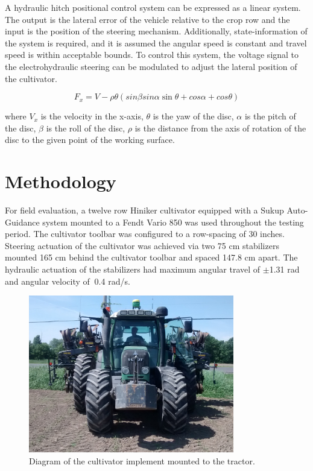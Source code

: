 \documentclass[authoryear]{elsarticle}
\begin{document}
A hydraulic hitch positional control system can be expressed as a
linear system. The output is the lateral error of the vehicle relative
to the crop row and the input is the position of the steering
mechanism. Additionally, state-information of the system is required,
and it is assumed the angular speed is constant and travel speed is
within acceptable bounds. To control this system, the voltage signal
to the electrohydraulic steering can be modulated to adjust the
lateral position of the cultivator.

\begin{equation}
  F_x = V - \rho\theta(sin \beta sin \alpha \sin \theta + cos \alpha +
  cos \theta)
  \label{eq:horizontal_velocity}
\end{equation}
\begin{flushleft}
where $V_x$ is the velocity in the x-axis, $\theta$ is the yaw of the
disc, $\alpha$ is the pitch of the
disc, $\beta$ is the roll of the disc, $\rho$ is the distance from
the axis of rotation of the disc to the given point of the working surface.
\end{flushleft}

\section{Methodology}
For field evaluation, a twelve row Hiniker cultivator equipped with a
Sukup Auto-Guidance system mounted to a Fendt Vario 850 was used
throughout the testing period. The cultivator toolbar was configured
to a row-spacing of 30 inches. Steering actuation of the cultivator
was achieved via two 75 cm stabilizers mounted 165 cm behind the
cultivator toolbar and spaced 147.8 cm apart. The hydraulic actuation
of the stabilizers had maximum angular travel of $\pm$1.31 rad and angular
velocity of $~$0.4 rad/s.

\begin{figure}
  \centering
  \includegraphics[width=0.8\textwidth,natwidth=610,natheight=642]{fendt_front.jpg}
  \caption{Diagram of the cultivator implement mounted to the tractor.}
\end{figure}
\end{document}
